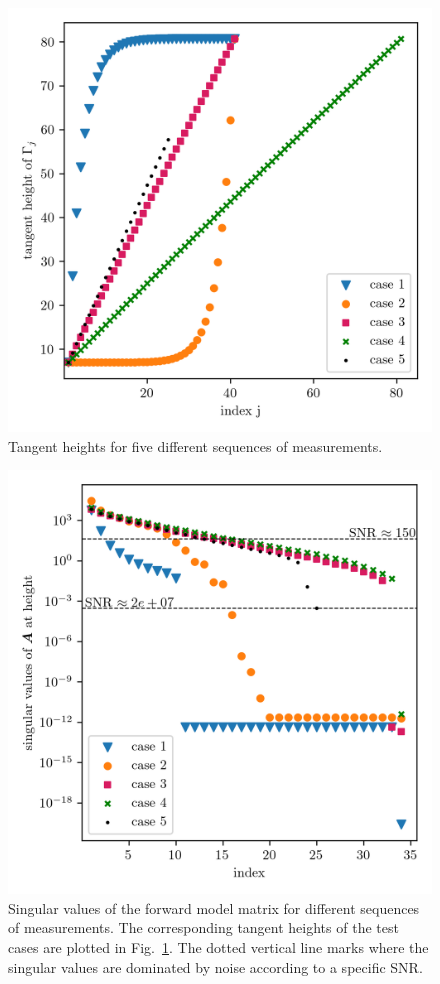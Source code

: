 \begin{figure}[ht!]
	\centering
	\includegraphics{MeasTangHeight.png}
	\caption[Tangent heights for different sequences of measurements.]{Tangent heights for five different sequences of measurements.}
	\label{fig:TangHCases}
\end{figure}
\begin{figure}[ht!]
	\centering
	\includegraphics{SingValA.png}
	\caption[Singular values of linear forward model matrix for different sequences of measurements.]{Singular values of the forward model matrix for different sequences of measurements.
		The corresponding tangent heights of the test cases are plotted in Fig.~\ref{fig:TangHCases}. The dotted vertical line marks where the singular values are dominated by noise according to a specific SNR.}
	\label{fig:SingA}
\end{figure}
